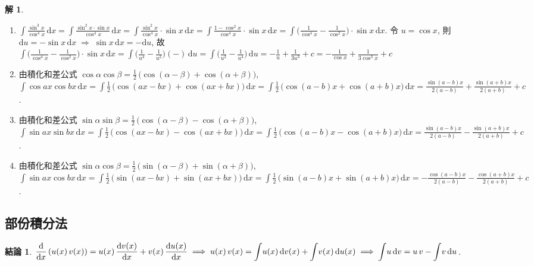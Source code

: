 \documentclass[12pt]{extarticle}
\newcommand{\ds}{\displaystyle}
\newcommand{\ie}{\;\Longrightarrow\;}
\theoremstyle{definition}
\newtheorem*{fact}{結論}
\newtheorem*{sol}{解}
\newcommand{\myline}{\noindent\makebox[\linewidth]{\rule{\paperwidth}{0.4pt}}}
\begin{document}
\begin{sol}
\begin{enumerate}
    \item $\ds\int\!\frac{\sin^3 x}{\cos^4 x}\,\text{d}x = \int\!\frac{\sin^2x\cdot\sin x}{\cos^4 x}\,\text{d}x = \int\!\frac{\sin^2x}{\cos^4 x}\cdot\sin x\,\text{d}x = \int\!\frac{1 - \cos^2 x}{\cos^4 x}\cdot\sin x\,\text{d}x = \int\!\Big(\frac{1}{\cos^4 x} - \frac{1}{\cos^2 x}\Big)\cdot\sin x\,\text{d}x$. 令 $\ds u = \cos x$, 則 $\ds\text{d}u = -\sin x\,\text{d}x\ie\sin x\,\text{d}x = -\text{d}u$, 故 $\ds\int\!\Big(\frac{1}{\cos^4 x} - \frac{1}{\cos^2 x}\Big)\cdot\sin x\,\text{d}x = \int\!\Big(\frac{1}{u^4} - \frac{1}{u^2}\Big)(-)\,\text{d}u = \int\!\Big(\frac{1}{u^2} - \frac{1}{u^4}\Big)\,\text{d}u = -\frac{1}{u} + \frac{1}{3u^3} + c = -\frac{1}{\cos x} + \frac{1}{3\cos^3 x} + c$
    \item 由積化和差公式 $\ds\cos\alpha\cos\beta = \frac{1}{2}\,\big(\cos(\alpha - \beta) + \cos(\alpha + \beta)\big)$, $\ds\int\!\cos ax\cos bx\,\text{d}x = \int\!\frac{1}{2}\,\big(\cos(ax - bx) + \cos(ax + bx)\big)\,\text{d}x = \int\!\frac{1}{2}\,\big(\cos(a - b)x + \cos(a + b)x\big)\,\text{d}x = \frac{\sin{(a-b)x}}{2(a-b)} + \frac{\sin{(a+b)x}}{2(a+b)}+ c$. 
    \item 由積化和差公式 $\ds\sin\alpha\sin\beta = \frac{1}{2}\,\big(\cos(\alpha - \beta) - \cos(\alpha + \beta)\big)$, $\ds\int\!\sin ax\sin bx\,\text{d}x = \int\!\frac{1}{2}\,\big(\cos(ax - bx) - \cos(ax + bx)\big)\,\text{d}x = \int\!\frac{1}{2}\,\big(\cos(a - b)x - \cos(a + b)x\big)\,\text{d}x = \frac{\sin{(a-b)x}}{2(a-b)} - \frac{\sin{(a+b)x}}{2(a+b)}+ c$. 
    \item 由積化和差公式 $\ds\sin\alpha\cos\beta = \frac{1}{2}\,\big(\sin(\alpha - \beta) + \sin(\alpha + \beta)\big)$, $\ds\int\!\sin ax\cos bx\,\text{d}x = \int\!\frac{1}{2}\,\big(\sin(ax - bx) + \sin(ax + bx)\big)\,\text{d}x = \int\!\frac{1}{2}\,\big(\sin(a - b)x + \sin(a + b)x\big)\,\text{d}x = -\frac{\cos{(a-b)x}}{2(a-b)} - \frac{\cos{(a+b)x}}{2(a+b)}+ c$. 
  \end{enumerate}
\end{sol}

\myline

\subsection*{部份積分法}

\begin{fact}
  $\ds\frac{\text{d}}{\text{d}x}\,(u(x)\,v(x)) = u(x)\,\frac{\text{d}v(x)}{\text{d}x} + v(x)\,\frac{\text{d}u(x)}{\text{d}x}\ie u(x)\,v(x) = \int\!u(x)\,\text{d}v(x) + \int\!v(x)\,\text{d}u(x) \\ \ie \int\!u\,\text{d}v = u\,v - \int\!v\,\text{d}u$. 
\end{fact}
\end{document}

